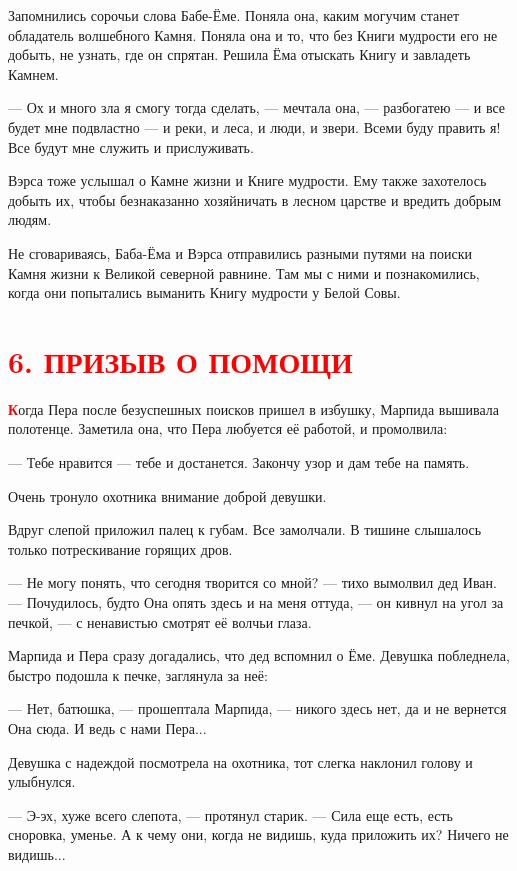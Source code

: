 \documentclass[12pt, a4paper, openany]{book}
\begin{document}
	Запомнились сорочьи слова Бабе-Ёме. Поняла она, каким могучим станет обладатель волшебного Камня. Поняла она и то, что без Книги мудрости его не добыть, не узнать, где он спрятан. Решила Ёма отыскать Книгу и завладеть Камнем.
	
	— Ох и много зла я смогу тогда сделать, — мечтала она, — разбогатею — и все будет мне подвластно — и реки, и леса, и люди, и звери. Всеми буду править я! Все будут мне служить и прислуживать.
	
	Вэрса тоже услышал о Камне жизни и Книге мудрости. Ему также захотелось добыть их, чтобы безнаказанно хозяйничать в лесном царстве и вредить добрым людям.
	
	Не сговариваясь, Баба-Ёма и Вэрса отправились разными путями на поиски Камня жизни к Великой северной равнине. Там мы с ними и познакомились, когда они попытались выманить Книгу мудрости у Белой Совы.
	
	\section[6. Призыв о помощи]{\center \textcolor{red}{6. ПРИЗЫВ О ПОМОЩИ}}
	
	\lettrine[findent=0pt]{\textbf{\textcolor{red}{К}}}{}огда Пера после безуспешных поисков пришел в избушку, Марпида вышивала полотенце. Заметила она, что Пера любуется её работой, и промолвила:
	
	— Тебе нравится — тебе и достанется. Закончу узор и дам тебе на память.
	
	Очень тронуло охотника внимание доброй девушки.
	
	Вдруг слепой приложил палец к губам. Все замолчали. В тишине слышалось только потрескивание горящих дров.
	
	— Не могу понять, что сегодня творится со мной? — тихо вымолвил дед Иван. — Почудилось, будто Она опять здесь и на меня оттуда, — он кивнул на угол за печкой, — с ненавистью смотрят её волчьи глаза.
	
	Марпида и Пера сразу догадались, что дед вспомнил о Ёме. Девушка побледнела, быстро подошла к печке, заглянула за неё:
	
	— Нет, батюшка, — прошептала Марпида, — никого здесь нет, да и не вернется Она сюда. И ведь с нами Пера...
	
	Девушка с надеждой посмотрела на охотника, тот слегка наклонил голову и улыбнулся.
	
	— Э-эх, хуже всего слепота, — протянул старик. — Сила еще есть, есть сноровка, уменье. А к чему они, когда не видишь, куда приложить их? Ничего не видишь...
	
\end{document}
